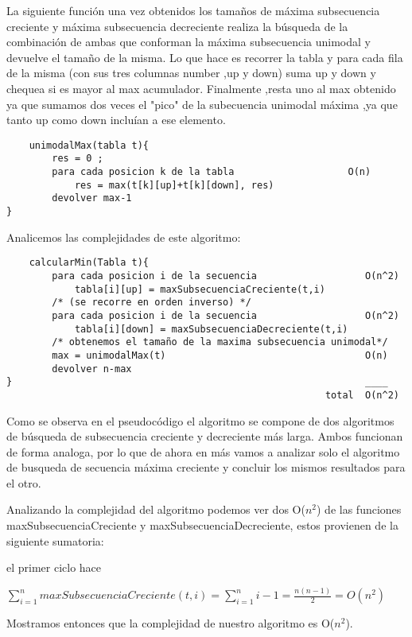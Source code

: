 La siguiente función una vez obtenidos los tamaños de máxima subsecuencia creciente y máxima subsecuencia decreciente realiza la búsqueda de la combinación de ambas que conforman la máxima subsecuencia unimodal y devuelve el tamaño de la misma.
Lo que hace es recorrer la tabla y para cada fila de la misma (con sus tres columnas number ,up y down) suma up y down y chequea si es mayor al max acumulador.
Finalmente ,resta uno al max obtenido ya que sumamos dos veces el "pico" de la subecuencia unimodal máxima ,ya que tanto up como down incluían a ese elemento. 

\begin{verbatim}
    unimodalMax(tabla t){
        res = 0 ;
        para cada posicion k de la tabla                    O(n)
            res = max(t[k][up]+t[k][down], res)
        devolver max-1
}
\end{verbatim}


Analicemos las complejidades de este algoritmo:

\begin{verbatim}
    calcularMin(Tabla t){
        para cada posicion i de la secuencia                   O(n^2)
            tabla[i][up] = maxSubsecuenciaCreciente(t,i)
        /* (se recorre en orden inverso) */
        para cada posicion i de la secuencia                   O(n^2)  
            tabla[i][down] = maxSubsecuenciaDecreciente(t,i)
        /* obtenemos el tamaño de la maxima subsecuencia unimodal*/   
        max = unimodalMax(t)                                   O(n)  
        devolver n-max
}                                                              ____
                                                        total  O(n^2)
\end{verbatim}

Como se observa en el pseudocódigo el algoritmo se compone de dos algoritmos de búsqueda de subsecuencia creciente y decreciente más larga. Ambos funcionan de forma analoga, por lo que de ahora en más vamos a analizar solo el algoritmo de busqueda de secuencia máxima creciente y concluir los mismos resultados para el otro.

Analizando la complejidad del algoritmo podemos ver dos O($n^{2}$) de las funciones maxSubsecuenciaCreciente y maxSubsecuenciaDecreciente, estos provienen de la siguiente sumatoria:

el primer ciclo hace

$\displaystyle\sum_{i=1}^n maxSubsecuenciaCreciente(t, i) = \sum_{i=1}^{n} i-1  = \frac{n(n-1)}{2} = O(n^{2})$

                       
Mostramos entonces que la complejidad de nuestro algoritmo es O($n^{2}$).





